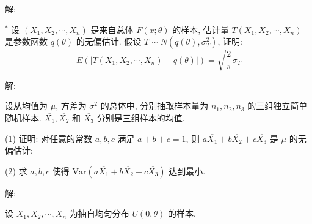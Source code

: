 \documentclass[standard]{ExBook}
\begin{document}
\begin{qitems}
\vspace{-5em}

    \begin{bbox}
解: 
    \end{bbox}

\vspace{-5em}

    \begin{bbox}
    \begin{shaded}
        \qitem$^*$
设 \((X_1, X_2, \cdots, X_n)\) 是来自总体 \(F(x; \theta)\) 的样本, 估计量 \(T(X_1, X_2, \cdots, X_n)\) 是参数函数 \(q(\theta)\) 的无偏估计. 假设 \(T \sim N(q(\theta), \sigma_T^2)\), 证明:
\[E\left(\left|T(X_1, X_2, \cdots, X_n) - q(\theta)\right|\right) = \sqrt{\frac{2}{\pi}} \sigma_T\]
    \end{shaded}
    \end{bbox}

\vspace{-5em}

    \begin{bbox}
解: 
    \end{bbox}

\vspace{-5em}

    \begin{bbox}
    \begin{shaded}
        \qitem
设从均值为 \(\mu\), 方差为 \(\sigma^2\) 的总体中, 分别抽取样本量为 \(n_1, n_2, n_3\) 的三组独立简单随机样本. \(\overline{X_1}, \overline{X_2}\) 和 \(\overline{X_3}\) 分别是三组样本的均值.

(1) 证明: 对任意的常数 \(a, b, c\) 满足 \(a + b + c = 1\), 则 \(a\overline{X_1} + b\overline{X_2} + c\overline{X_3}\) 是 \(\mu\) 的无偏估计;

(2) 求 \(a, b, c\) 使得 \(\text{Var}(a\overline{X_1} + b\overline{X_2} + c\overline{X_3})\) 达到最小.
    \end{shaded}
    \end{bbox}

\vspace{-5em}

    \begin{bbox}
解: 
    \end{bbox}

\vspace{-5em}

    \begin{bbox}
    \begin{shaded}
        \qitem
设 \(X_1, X_2, \cdots, X_n\) 为抽自均匀分布 \(U(0, \theta)\) 的样本.


\end{shaded}
\end{bbox}
\end{qitems}
\end{document}
